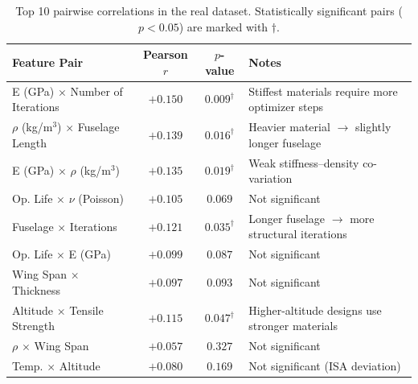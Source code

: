 \documentclass[11pt, a4paper]{report}
\begin{document}
\begin{table}[H]
\centering
\caption{Top 10 pairwise correlations in the real dataset. Statistically significant pairs ($p < 0.05$) are marked with $\dagger$.}
\label{tab:top_corr}
\begin{tabular}{lccl}
\toprule
\textbf{Feature Pair} & \textbf{Pearson $r$} & \textbf{$p$-value} & \textbf{Notes} \\
\midrule
E (GPa) $\times$ Number of Iterations         & $+0.150$ & $0.009^{\dagger}$ & Stiffest materials require more optimizer steps \\
$\rho$ (kg/m$^3$) $\times$ Fuselage Length   & $+0.139$ & $0.016^{\dagger}$ & Heavier material $\to$ slightly longer fuselage \\
E (GPa) $\times$ $\rho$ (kg/m$^3$)           & $+0.135$ & $0.019^{\dagger}$ & Weak stiffness--density co-variation \\
Op. Life $\times$ $\nu$ (Poisson)             & $+0.105$ & $0.069$           & Not significant \\
Fuselage $\times$ Iterations                   & $+0.121$ & $0.035^{\dagger}$ & Longer fuselage $\to$ more structural iterations \\
Op. Life $\times$ E (GPa)                      & $+0.099$ & $0.087$           & Not significant \\
Wing Span $\times$ Thickness                   & $+0.097$ & $0.093$           & Not significant \\
Altitude $\times$ Tensile Strength             & $+0.115$ & $0.047^{\dagger}$ & Higher-altitude designs use stronger materials \\
$\rho$ $\times$ Wing Span                      & $+0.057$ & $0.327$           & Not significant \\
Temp. $\times$ Altitude                        & $+0.080$ & $0.169$           & Not significant (ISA deviation) \\
\bottomrule
\end{tabular}
\end{table}
\end{document}
